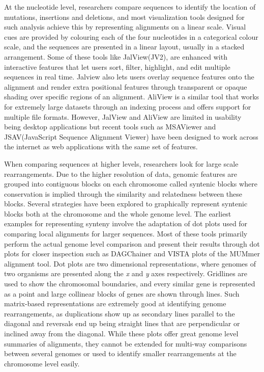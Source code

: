At the nucleotide level, researchers compare sequences to identify the location of mutations, insertions and deletions, and most visualization tools designed for such analysis achieve this by representing alignments on a linear scale. Visual cues are provided by colouring each of the four nucleotides in a categorical colour scale, and the sequences are presented in a linear layout, usually in a stacked arrangement. Some of these tools like JalView(JV2)\cite{waterhouse2009jalview}, are enhanced with interactive features that let users sort, filter, highlight, and edit multiple sequences in real time. Jalview also lets users overlay sequence features onto the alignment and render extra positional features through transparent or opaque shading over specific regions of an alignment. AliView is a similar tool that works for extremely large datasets through an indexing process and offers support for multiple file formats\cite{larsson2014aliview}. However, JalView and AliView are limited in usability being desktop applications but recent tools such as MSAViewer\cite{yachdav2016msaviewer} and JSAV(JavaScript Sequence Alignment Viewer)\cite{martin2014viewing} have been designed to work across the internet as web applications with the same set of features.

When comparing sequences at higher levels, researchers look for large scale rearrangements. Due to the higher resolution of data, genomic features are grouped into contiguous blocks on each chromosome called syntenic blocks where conservation is implied through the similarity and relatedness between these blocks.
Several strategies have been explored to graphically represent syntenic blocks both at the chromosome and the whole genome level. The earliest examples for representing synteny involve the adaptation of dot plots used for comparing local alignments for larger sequences. Most of these tools primarily perform the actual genome level comparison and present their results through dot plots for closer inspection such as DAGChainer\cite{haas2004dagchainer} and VISTA plots of the MUMmer alignment tool\cite{kurtz2004versatile}. Dot plots are two dimensional representations, where genomes of two organisms are presented along the \textit{x} and \textit{y} axes respectively. Gridlines are used to show the chromosomal boundaries, and every similar gene is represented as a point and large collinear blocks of genes are shown through lines. Such matrix-based representations are extremely good at identifying genome rearrangements, as duplications show up as secondary lines parallel to the diagonal and reversals end up being straight lines that are perpendicular or inclined away from the diagonal. While these plots offer great genome level summaries of alignments, they cannot be extended for multi-way comparisons between several genomes or used to identify smaller rearrangements at the chromosome level easily.

